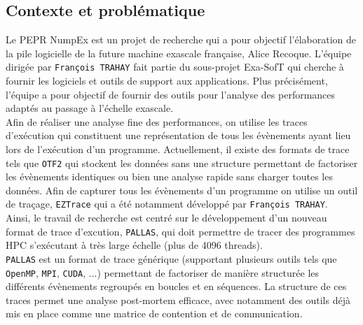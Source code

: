 

\subsection{Contexte et problématique}\label{ssec:introduction_contexte_problematique}

Le PEPR NumpEx est un projet de recherche qui a pour objectif l'élaboration de la pile logicielle de la future machine exascale française, Alice Recoque. L'équipe dirigée par \verb!François TRAHAY!
fait partie du sous-projet Exa-SofT qui cherche à fournir les logiciels et outils de support aux applications. Plus précisément, l'équipe a pour objectif de fournir des outils pour l'analyse des performances
adaptés au passage à l'échelle exascale. \\
Afin de réaliser une analyse fine des performances, on utilise les traces d'exécution qui constituent une représentation de tous les évènements ayant lieu lors de l'exécution d'un programme.
Actuellement, il existe des formats de trace tels que \verb!OTF2! qui stockent les données sans une structure permettant de factoriser les évènements identiques ou bien une analyse rapide sans charger toutes les données. 
Afin de capturer tous les évènements d'un programme on utilise un outil de traçage, \verb!EZTrace! qui a été notamment développé par \verb!François TRAHAY!.
\\Ainsi, le travail de recherche est centré sur le développement d'un nouveau format de trace d'excution, \verb!PALLAS!, qui doit permettre de tracer des programmes HPC s'exécutant à très large échelle
(plus de 4096 threads).\\
\verb!PALLAS! est un format de trace générique (supportant plusieurs outils tels que \verb!OpenMP!, \verb!MPI!, \verb!CUDA!, ...) permettant de factoriser de manière structurée les différents évènements 
regroupés en boucles et en séquences. La structure de ces traces permet une analyse post-mortem efficace, avec notamment des outils déjà mis en place comme une matrice
de contention et de communication.





